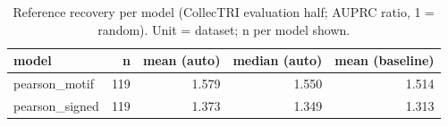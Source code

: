 \begin{table}[H]\centering\small
\caption{Reference recovery per model (CollecTRI evaluation half; AUPRC ratio, 1 = random). Unit = dataset; n per model shown.}
\begin{tabular}{lrrrr}\toprule
model & n & mean (auto) & median (auto) & mean (baseline) \\ \midrule
pearson\_motif & 119 & 1.579 & 1.550 & 1.514 \\
pearson\_signed & 119 & 1.373 & 1.349 & 1.313 \\
\bottomrule\end{tabular}\end{table}
